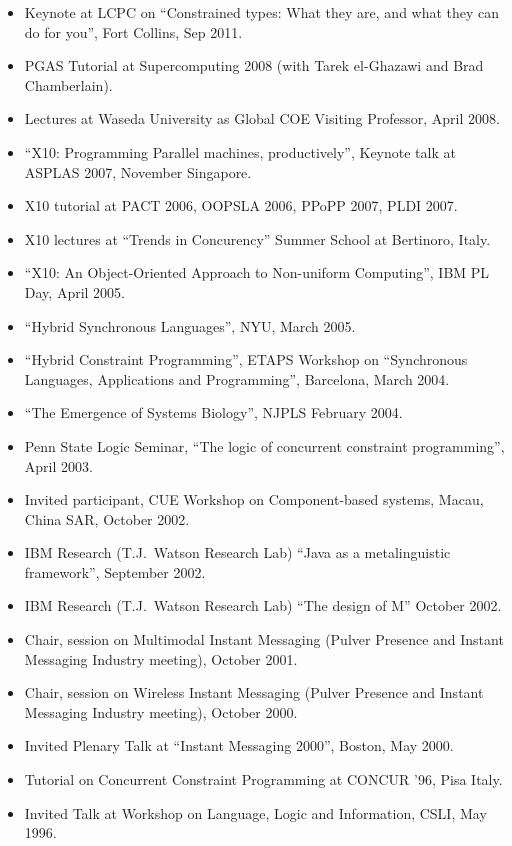 \documentclass{article}
\begin{document}
\begin{itemize}
\item Keynote at LCPC on ``Constrained types: What they are, and what
  they can do for you'', Fort Collins, Sep 2011. 
\item PGAS Tutorial at Supercomputing 2008 (with Tarek el-Ghazawi and Brad Chamberlain).
\item Lectures at Waseda University as Global COE Visiting Professor,
April 2008.
\item ``X10: Programming Parallel machines, productively'', Keynote
talk at ASPLAS 2007, November Singapore.
\item X10 tutorial at PACT 2006, OOPSLA 2006, PPoPP 2007, PLDI 2007.
\item X10 lectures at ``Trends in Concurency'' Summer School at
Bertinoro, Italy.
\item ``X10: An Object-Oriented Approach to Non-uniform Computing'',
IBM PL Day, April 2005.
\item ``Hybrid Synchronous Languages'', NYU, March 2005.
\item ``Hybrid Constraint Programming'', ETAPS Workshop on
``Synchronous Languages, Applications and Programming'', Barcelona,
March 2004.
\item ``The Emergence of Systems Biology'', NJPLS February 2004.
\item 
Penn State Logic Seminar, ``The logic of concurrent constraint
programming'', April 2003.
\item 
Invited participant, CUE Workshop on Component-based systems, Macau,
China SAR, October 2002.
\item IBM Research (T.J.~Watson Research Lab) ``Java as a metalinguistic
framework'', September 2002.
\item 
IBM Research (T.J.~Watson Research Lab) ``The design of M''
October 2002.
\item
Chair, session on Multimodal Instant Messaging (Pulver Presence and
Instant Messaging Industry meeting), October 2001.

\item
Chair, session on Wireless Instant Messaging (Pulver Presence and
Instant Messaging Industry meeting), October 2000.

\item Invited Plenary Talk at ``Instant Messaging 2000'', Boston, May
    2000.

\item Tutorial on Concurrent Constraint Programming at CONCUR
    '96, Pisa Italy.

 \item Invited Talk at Workshop on Language, Logic and
    Information, CSLI, May 1996.


\end{itemize}
\end{document}
